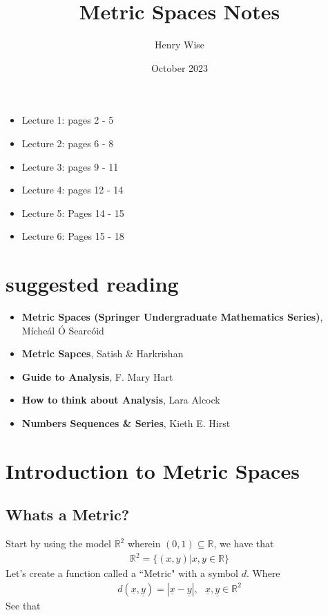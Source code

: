 \documentclass[10pt]{article}
\title{Metric Spaces Notes}
\author{Henry Wise}
\date{October 2023}
\begin{document}
\maketitle

\tableofcontents
\begin{multicols}{3}
\begin{itemize}
    \item Lecture 1: pages 2 - 5
    \item Lecture 2: pages 6 - 8
    \item Lecture 3: pages 9 - 11
    \item Lecture 4: pages 12 - 14
    \item Lecture 5: Pages 14 - 15
    \item Lecture 6: Pages 15 - 18
\end{itemize}
\end{multicols}
\vspace*{\fill}
\section{suggested reading}
\begin{itemize}
    \item \textbf{Metric Spaces (Springer Undergraduate Mathematics Series)}, Mícheál Ó Searcóid \cite{Book 1}
    \item \textbf{Metric Sapces}, Satish \& Harkrishan \cite{Book 2}
    \item \textbf{Guide to Analysis}, F. Mary Hart \cite{Book 3}
    \item \textbf{How to think about Analysis}, Lara Alcock \cite{Book 4}
    \item \textbf{Numbers Sequences \& Series}, Kieth E. Hirst \cite{Book 5}
\end{itemize}

\newpage

\section{Introduction to Metric Spaces}
\subsection{Whats a Metric?}
Start by using the model $\mathbb{R}^{2}$ wherein $(0,1)\subseteq\mathbb{R}$, we have that
\begin{align*}
    \mathbb{R}^{2}=\{(x,y)|x,y\in\mathbb{R}\}
\end{align*}
Let's create a function called a ``Metric" with a symbol $d$. Where
\begin{align*}
    d(\underline{x},\underline{y})=|\underline{x}-\underline{y}|,\,\,\,\,\underline{x},\underline{y}\in\mathbb{R}^{2}
\end{align*}
See that
\end{document}
